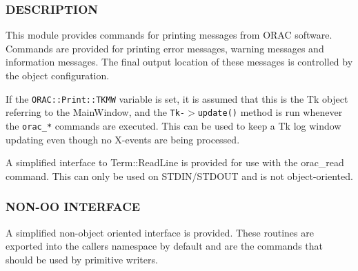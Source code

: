 \subsubsection*{DESCRIPTION\label{ORAC::Print_DESCRIPTION}}

This module provides commands for printing messages from ORAC
software. Commands are provided for printing error messages, warning
messages and information messages. The final output location of these
messages is controlled by the object configuration.



If the \texttt{ORAC::Print::TKMW} variable is set, it is assumed that this
is the Tk object referring to the MainWindow, and the
\texttt{Tk-$>$update()} method is run whenever the \texttt{orac\_*} commands are
executed.  This can be used to keep a Tk log window updating even
though no X-events are being processed.



A simplified interface to Term::ReadLine is provided for use with
the orac\_read command. This can only be used on STDIN/STDOUT and
is not object-oriented.

\subsubsection*{NON-OO INTERFACE\label{ORAC::Print_NON-OO_INTERFACE}}

A simplified non-object oriented interface is provided.
These routines are exported into the callers namespace by default
and are the commands that should be used by primitive writers.

